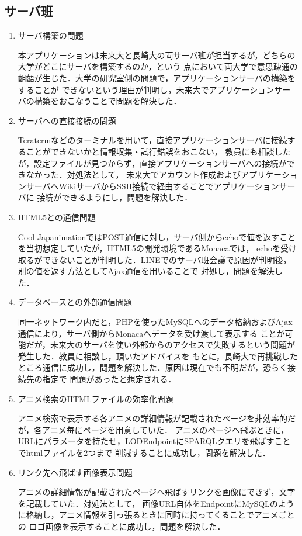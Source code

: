 \subsection{サーバ班}
\begin{enumerate}

\item サーバ構築の問題
\par
本アプリケーションは未来大と長崎大の両サーバ班が担当するが，どちらの大学がどこにサーバを構築するのか，という
点において両大学で意思疎通の齟齬が生じた．大学の研究室側の問題で，アプリケーションサーバの構築をすることが
できないという理由が判明し，未来大でアプリケーションサーバの構築をおこなうことで問題を解決した．

\item サーバへの直接接続の問題
\par
Teratermなどのターミナルを用いて，直接アプリケーションサーバに接続することができないかと情報収集・試行錯誤をおこない，
教員にも相談したが，設定ファイルが見つからず，直接アプリケーションサーバへの接続ができなかった．対処法として，
未来大でアカウント作成およびアプリケーションサーバへWikiサーバからSSH接続で経由することでアプリケーションサーバに
接続ができるようにし，問題を解決した．

\item HTML5との通信問題
\par
Cool JapanimationではPOST通信に対し，サーバ側からechoで値を返すことを当初想定していたが，HTML5の開発環境であるMonacaでは，
echoを受け取るができないことが判明した．LINEでのサーバ班会議で原因が判明後，別の値を返す方法としてAjax通信を用いることで
対処し，問題を解決した．

\item データベースとの外部通信問題
\par
同一ネットワーク内だと，PHPを使ったMySQLへのデータ格納およびAjax通信により，サーバ側からMonacaへデータを受け渡して表示する
ことが可能だが，未来大のサーバを使い外部からのアクセスで失敗するという問題が発生した．教員に相談し，頂いたアドバイスを
もとに，長崎大で再挑戦したところ通信に成功し，問題を解決した．原因は現在でも不明だが，恐らく接続先の指定で
問題があったと想定される．

\item アニメ検索のHTMLファイルの効率化問題
\par
アニメ検索で表示する各アニメの詳細情報が記載されたページを非効率的だが，各アニメ毎にページを用意していた．
アニメのページへ飛ぶときに，URLにパラメータを持たせ，LODEndpointにSPARQLクエリを飛ばすことでhtmlファイルを2つまで
削減することに成功し，問題を解決した．

\item リンク先へ飛ばす画像表示問題
\par
アニメの詳細情報が記載されたページへ飛ばすリンクを画像にできず，文字を記載していた．対処法として，
画像URL自体をEndpointにMySQLのように格納し，アニメ情報を引っ張るときに同時に持ってくることでアニメごとの
ロゴ画像を表示することに成功し，問題を解決した．

\end{enumerate}
